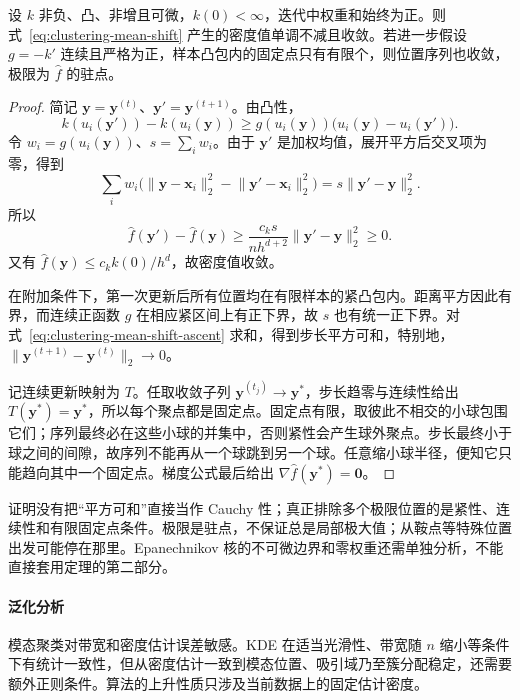 \begin{theorem}
 \label{thm:clustering-mean-shift}
 设 $k$ 非负、凸、非增且可微，$k(0)<\infty$，迭代中权重和始终为正。则式~\eqref{eq:clustering-mean-shift} 产生的密度值单调不减且收敛。若进一步假设 $g=-k'$ 连续且严格为正，样本凸包内的固定点只有有限个，则位置序列也收敛，极限为 $\hat f$ 的驻点。
\end{theorem}
\begin{proof}
简记 $\bm{y}=\bm{y}^{(t)}$、$\bm{y}'=\bm{y}^{(t+1)}$。由凸性，
\[
 k(u_i(\bm{y}'))-k(u_i(\bm{y}))
 \geq g(u_i(\bm{y}))
       \bigl(u_i(\bm{y})-u_i(\bm{y}')\bigr).
\]
令 $w_i=g(u_i(\bm{y}))$、$s=\sum_iw_i$。由于 $\bm{y}'$ 是加权均值，展开平方后交叉项为零，得到
\[
 \sum_iw_i\bigl(
 \lVert\bm{y}-\bm{x}_i\rVert_2^2
 -\lVert\bm{y}'-\bm{x}_i\rVert_2^2\bigr)
 =s\lVert\bm{y}'-\bm{y}\rVert_2^2.
\]
所以
\begin{equation}
 \hat f(\bm{y}')-\hat f(\bm{y})
 \geq\frac{c_k s}{nh^{d+2}}
       \lVert\bm{y}'-\bm{y}\rVert_2^2\geq0.
 \label{eq:clustering-mean-shift-ascent}
\end{equation}
又有 $\hat f(\bm{y})\leq c_k k(0)/h^d$，故密度值收敛。

在附加条件下，第一次更新后所有位置均在有限样本的紧凸包内。距离平方因此有界，而连续正函数 $g$ 在相应紧区间上有正下界，故 $s$ 也有统一正下界。对式~\eqref{eq:clustering-mean-shift-ascent} 求和，得到步长平方可和，特别地，$\lVert\bm{y}^{(t+1)}-\bm{y}^{(t)}\rVert_2\to0$。

记连续更新映射为 $T$。任取收敛子列 $\bm{y}^{(t_j)}\to\bm{y}^\ast$，步长趋零与连续性给出 $T(\bm{y}^\ast)=\bm{y}^\ast$，所以每个聚点都是固定点。固定点有限，取彼此不相交的小球包围它们；序列最终必在这些小球的并集中，否则紧性会产生球外聚点。步长最终小于球之间的间隙，故序列不能再从一个球跳到另一个球。任意缩小球半径，便知它只能趋向其中一个固定点。梯度公式最后给出 $\nabla\hat f(\bm{y}^\ast)=\bm{0}$。
\end{proof}

证明没有把“平方可和”直接当作 Cauchy 性；真正排除多个极限位置的是紧性、连续性和有限固定点条件。极限是驻点，不保证总是局部极大值；从鞍点等特殊位置出发可能停在那里。Epanechnikov 核的不可微边界和零权重还需单独分析，不能直接套用定理的第二部分。

\paragraph{泛化分析}
模态聚类对带宽和密度估计误差敏感。KDE 在适当光滑性、带宽随 $n$ 缩小等条件下有统计一致性，但从密度估计一致到模态位置、吸引域乃至簇分配稳定，还需要额外正则条件。算法的上升性质只涉及当前数据上的固定估计密度。

